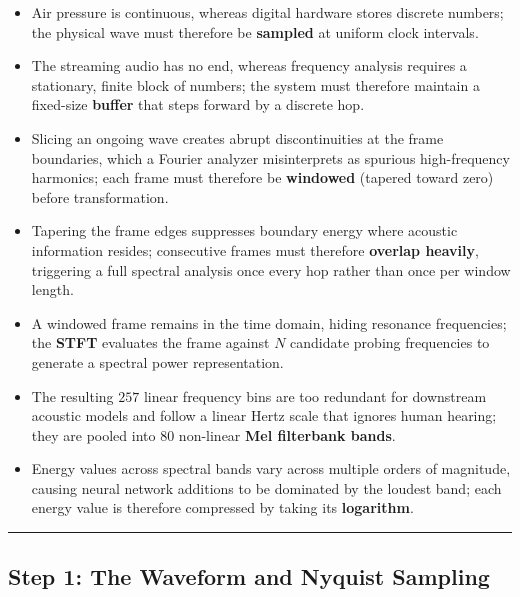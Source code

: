 \documentclass[11pt,a4paper]{article}
\begin{document}
{\small
\begin{itemize}\setlength{\itemsep}{-1.5pt}\setlength{\parsep}{0pt}\setlength{\topsep}{0.5pt}\setlength{\partopsep}{0pt}
    \item Air pressure is continuous, whereas digital hardware stores discrete numbers; the physical wave must therefore be \textbf{sampled} at uniform clock intervals.
    \item The streaming audio has no end, whereas frequency analysis requires a stationary, finite block of numbers; the system must therefore maintain a fixed-size \textbf{buffer} that steps forward by a discrete hop.
    \item Slicing an ongoing wave creates abrupt discontinuities at the frame boundaries, which a Fourier analyzer misinterprets as spurious high-frequency harmonics; each frame must therefore be \textbf{windowed} (tapered toward zero) before transformation.
    \item Tapering the frame edges suppresses boundary energy where acoustic information resides; consecutive frames must therefore \textbf{overlap heavily}, triggering a full spectral analysis once every hop rather than once per window length.
    \item A windowed frame remains in the time domain, hiding resonance frequencies; the \textbf{STFT} evaluates the frame against $N$ candidate probing frequencies to generate a spectral power representation.
    \item The resulting $257$ linear frequency bins are too redundant for downstream acoustic models and follow a linear Hertz scale that ignores human hearing; they are pooled into $80$ non-linear \textbf{Mel filterbank bands}.
    \item Energy values across spectral bands vary across multiple orders of magnitude, causing neural network additions to be dominated by the loudest band; each energy value is therefore compressed by taking its \textbf{logarithm}.
\end{itemize}
}

\vspace{0.5mm}
\hrule
\vspace{0.5mm}

\vspace{-2mm}
\subsection*{Step 1: The Waveform and Nyquist Sampling}
\vspace{-1.5mm}
\end{document}
